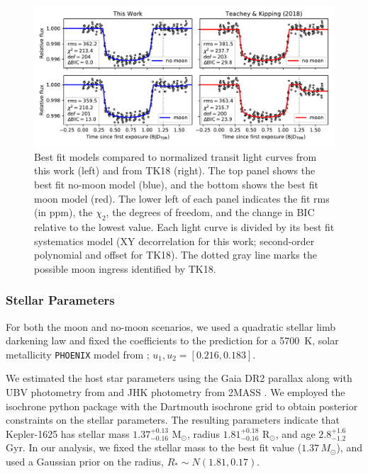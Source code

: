 \documentclass[twocolumn]{aastex62}
\begin{document}
\begin{figure}
\includegraphics[width = 1.0 \textwidth]{figures/fig3_bestfits.pdf}
    \caption{Best fit models compared to normalized transit light curves from this work (left) and from TK18 (right). The top panel shows the best fit no-moon model (blue), and the bottom shows the best fit moon model (red). The lower left of each panel indicates the fit rms (in ppm), the $\chi_2$, the degrees of freedom, and the change in BIC relative to the lowest value.  Each light curve is divided by its best fit systematics model (XY decorrelation for this work; second-order polynomial and offset for TK18).  The dotted gray line marks the possible moon ingress identified by TK18.}
\label{fig:bestfit}
\end{figure}


\subsubsection{Stellar Parameters}
For both the moon and no-moon scenarios, we used a quadratic stellar limb darkening law and fixed the coefficients to the prediction for a 5700~K, solar metallicity \texttt{PHOENIX} model from \cite{espinoza15}; $u_1, u_2 = [0.216, 0.183]$.  

We estimated the host star parameters using the Gaia DR2 parallax \citep{Gaia, GaiaDR2} along with UBV photometry from \citet{Everett2012} and JHK photometry from 2MASS \citep{2MASS}. We employed the isochrone python package \citep{isochrone} with the Dartmouth isochrone grid \citep{Dotter2008} to obtain posterior constraints on the stellar parameters. The resulting parameters indicate that Kepler-1625 has stellar mass $1.37^{+0.13}_{-0.16}$ M$_{\odot}$, radius $1.81^{+0.18}_{-0.16}$ R$_{\odot}$, and age $2.8^{+1.6}_{-1.2}$ Gyr. In our analysis, we fixed the stellar mass to the best fit value ($1.37\,M_\odot$), and used a Gaussian prior on the radius, $R_* \sim N(1.81, 0.17)$.
\end{document}
